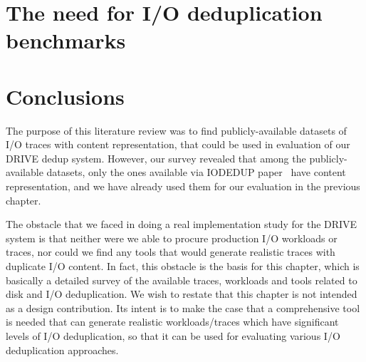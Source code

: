 \section{The need for I/O deduplication benchmarks}
\label{sec:architectingchap-case}


\section{Conclusions}
The purpose of this literature review was to find publicly-available 
datasets of I/O traces with content representation, that could be 
used in evaluation of our DRIVE dedup system. However, our survey 
revealed that among the publicly-available datasets, only the ones 
available via IODEDUP paper~\cite{iodedup} have content representation, 
and we have already used them for our evaluation in the previous chapter. 

The obstacle that we faced in doing a real implementation study for the 
DRIVE system is that neither were we able to procure production I/O 
workloads or traces, nor could we find any tools that would generate 
realistic traces with duplicate I/O content. In fact, this obstacle 
is the basis for this chapter, which is basically a detailed survey 
of the available traces, workloads and tools related to disk and I/O 
deduplication. We wish to restate that this chapter is not intended 
as a design contribution. Its intent is to make the case that a 
comprehensive tool is needed that can generate realistic 
workloads/traces which have significant levels of I/O deduplication, so 
that it can be used for evaluating various I/O deduplication approaches.
